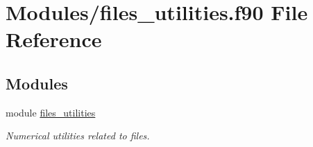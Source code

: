 \hypertarget{files__utilities_8f90}{}\section{Modules/files\+\_\+utilities.f90 File Reference}
\label{files__utilities_8f90}
\subsection*{Modules}
\begin{DoxyCompactItemize}
\item 
module \hyperlink{namespacefiles__utilities}{files\+\_\+utilities}
\begin{DoxyCompactList}\small\item\em Numerical utilities related to files. \end{DoxyCompactList}\end{DoxyCompactItemize}
